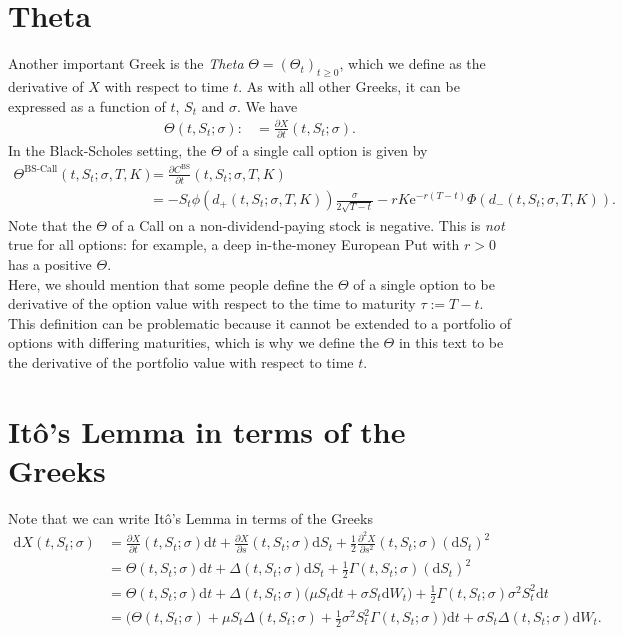 \documentclass[12pt]{book}
\numberwithin{equation}{chapter}
\theoremstyle{plain}
\numberwithin{theorem}{section}
\theoremstyle{definition}
\numberwithin{exercise}{chapter}
\newcommand{\<}{\langle}
\renewcommand{\>}{\rangle}
\renewcommand{\(}{\left(}
\renewcommand{\)}{\right)}
\renewcommand{\[}{\left[}
\renewcommand{\]}{\right]}
\newcommand\sig{\sigma}
\newcommand\Gam{\Gamma}
\newcommand\Del{\Delta}
\renewcommand\d{\partial}
\newcommand\dd{\mathrm{d}}
\newcommand\ee{\mathrm{e}}
\newcommand\BS{\textrm{BS}}
\theoremstyle{definition}
\numberwithin{question}{section}
\begin{document}
\section{Theta}
Another important Greek is the \textit{Theta} $\Theta = (\Theta_t)_{t \geq 0}$, which we define as the derivative of $X$ with respect to time $t$.  As with all other Greeks, it can be expressed as a function of $t$, $S_t$ and $\sig$.  We have
\begin{align}
\Theta(t,S_t;\sig)
	:&= \frac{\d X}{\d t}(t,S_t;\sig) .
\end{align}
In the Black-Scholes setting, the $\Theta$ of a single call option is given by
\begin{align}
\Theta^\text{BS-Call}(t,S_t;\sig,T,K)
	&= \frac{\d C^\BS}{\d t}(t,S_t;\sig,T,K) \\
	&= - S_t \phi(d_+(t,S_t;\sig,T,K)) \frac{\sigma}{2 \sqrt{T-t}} - r K \ee^{-r (T-t)} \Phi(d_-(t,S_t;\sig,T,K)) .
\end{align}
Note that the $\Theta$ of a Call on a non-dividend-paying stock is negative.  This is \textit{not} true for all options: for example, a deep in-the-money European Put with $r > 0$ has a positive $\Theta$.
\\[0.5em]
Here, we should mention that some people define the $\Theta$ of a single option to be derivative of the option value with respect to the time to maturity $\tau := T-t$.  This definition can be problematic because it cannot be extended to a portfolio of options with differing maturities, which is why we define the $\Theta$ in this text to be the derivative of the portfolio value with respect to time $t$.

\section{It\^o's Lemma in terms of the Greeks}
Note that we can write It\^o's Lemma in terms of the Greeks
\begin{align}
\dd X(t,S_t;\sig)
	&=	\frac{\d X}{\d t} (t,S_t;\sig)\dd t + \frac{\d X}{\d s}(t,S_t;\sig) \dd S_t 
			+ \frac{1}{2} \frac{\d^2 X}{\d s^2}(t,S_t;\sig) ( \dd S_t )^2 \\
	&=	\Theta(t,S_t;\sig) \dd t + \Del(t,S_t;\sig) \dd S_t + \frac{1}{2} \Gam(t,S_t;\sig) ( \dd S_t )^2 \\
	&=	\Theta(t,S_t;\sig) \dd t + \Del(t,S_t;\sig) \Big( \mu S_t \dd t 
			+ \sig S_t \dd W_t \Big) + \frac{1}{2} \Gam(t,S_t;\sig) \sig^2 S_t^2 \dd t \\
	&=	\Big( \Theta(t,S_t;\sig) + \mu S_t \Del(t,S_t;\sig) + \frac{1}{2} \sig^2 S_t^2 \Gam(t,S_t;\sig) \Big) \dd t 
			+ \sig S_t \Del(t,S_t;\sig)  \dd W_t . 
\end{align}
\end{document}
